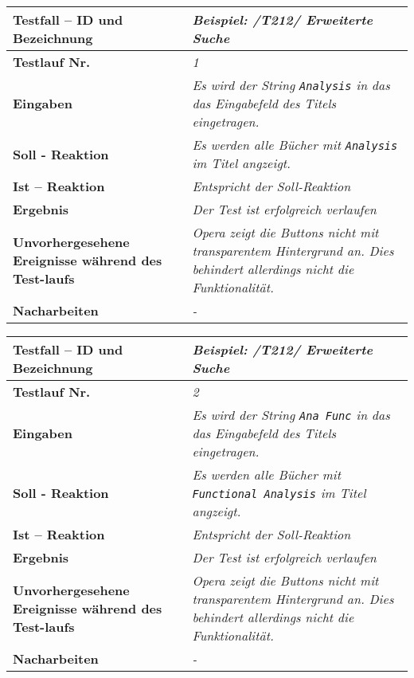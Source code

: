 \begin{longtable}{|p{5cm}|p{10cm}|}
\hline
\textbf{Testfall -- ID und Bezeichnung} & \textit{Beispiel: /T212/ Erweiterte
Suche} \\
\hline
\textbf{Testlauf Nr.} & \textit{1} \\
\hline
\textbf{Eingaben} & \textit{Es wird der String \lstinline{Analysis} in das
das Eingabefeld des Titels eingetragen.} \\
\hline
\textbf{Soll - Reaktion} & \textit{Es werden alle Bücher mit
\lstinline{Analysis} im Titel angzeigt.
} \\
\hline
\textbf{Ist -- Reaktion} & \textit{Entspricht der Soll-Reaktion} \\
\hline
\textbf{Ergebnis} & \textit{Der Test ist erfolgreich verlaufen} \\
\hline
\textbf{Unvorhergesehene Ereignisse w\"ahrend des Test-laufs } &
\textit{Opera zeigt die Buttons nicht mit transparentem Hintergrund an. Dies
behindert allerdings nicht die Funktionalität.} \\
\hline
\textbf{Nacharbeiten } & \textit{-} \\
\hline
\end{longtable}

\begin{longtable}{|p{5cm}|p{10cm}|}
\hline
\textbf{Testfall -- ID und Bezeichnung} & \textit{Beispiel: /T212/ Erweiterte
Suche} \\
\hline
\textbf{Testlauf Nr.} & \textit{2} \\
\hline
\textbf{Eingaben} & \textit{Es wird der String \lstinline{Ana Func} in das
das Eingabefeld des Titels eingetragen.} \\
\hline
\textbf{Soll - Reaktion} & \textit{Es werden alle Bücher mit
\lstinline{Functional Analysis} im Titel angzeigt.
} \\
\hline
\textbf{Ist -- Reaktion} & \textit{Entspricht der Soll-Reaktion} \\
\hline
\textbf{Ergebnis} & \textit{Der Test ist erfolgreich verlaufen} \\
\hline
\textbf{Unvorhergesehene Ereignisse w\"ahrend des Test-laufs } &
\textit{Opera zeigt die Buttons nicht mit transparentem Hintergrund an. Dies
behindert allerdings nicht die Funktionalität.} \\
\hline
\textbf{Nacharbeiten } & \textit{-} \\
\hline
\end{longtable}

